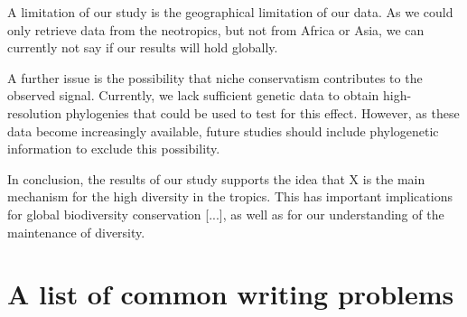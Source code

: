\documentclass{tufte-book}
\begin{document}
A limitation of our study is the geographical limitation of our data. As we could only retrieve data from the neotropics, but not from Africa or Asia, we can currently not say if our results will hold globally.

A further issue is the possibility that niche conservatism contributes to the observed signal. Currently, we lack sufficient genetic data to obtain high-resolution phylogenies that could be used to test for this effect. However, as these data become increasingly available, future studies should include phylogenetic information to exclude this possibility.

In conclusion, the results of our study supports the idea that X is the main mechanism for the high diversity in the tropics. This has important implications for global biodiversity conservation [...], as well as for our understanding of the maintenance of diversity.

\section{A list of common writing problems}
\end{document}
